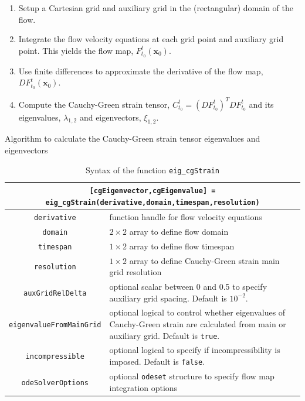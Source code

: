 \documentclass{article}
\begin{document}
\begin{table}
\begin{enumerate}
\item Setup a Cartesian grid and auxiliary grid in the (rectangular) domain of the flow.
\item Integrate the flow velocity equations at each grid point and auxiliary grid point. This yields the flow map, $F_{t_0}^t(\boldsymbol x_0)$.
\item Use finite differences to approximate the derivative of the flow map, $D F_{t_0}^t(\boldsymbol x_0)$.
\item Compute the Cauchy-Green strain tensor, $C_{t_0}^t = \left(D F_{t_0}^t\right)^T D F_{t_0}^t$ and its eigenvalues, $\lambda_{1,2}$ and eigenvectors, $\xi_{1,2}$.
\end{enumerate}
\caption{Algorithm to calculate the Cauchy-Green strain tensor eigenvalues and eigenvectors}
\label{t:Cauchy-Green algorithm}
\end{table}

\begin{table}
\begin{center}
\begin{tabular}{|c|p{}|}
\hline \hline
\multicolumn{2}{|p{\textwidth}|}{\lstinline![cgEigenvector,cgEigenvalue] = eig_cgStrain(derivative,domain,timespan,resolution)!}\\
\hline
\lstinline!derivative! & function handle for flow velocity equations\\
\hline
\lstinline!domain! & $2 \times 2$ array to define flow domain\\
\hline
\lstinline!timespan! & $1 \times 2$ array to define flow timespan\\
\hline
\lstinline!resolution! & $1 \times 2$ array to define Cauchy-Green strain main grid resolution\\
\hline
\lstinline!auxGridRelDelta! & optional scalar between 0 and 0.5 to specify auxiliary grid spacing. Default is $10^{-2}$.\\
\hline
\lstinline!eigenvalueFromMainGrid! & optional logical to control whether eigenvalues of Cauchy-Green strain are calculated from main or auxiliary grid. Default is \lstinline!true!.\\
\hline
\lstinline!incompressible! & optional logical to specify if incompressibility is imposed. Default is  \lstinline!false!.\\
\hline
\lstinline!odeSolverOptions! & optional \lstinline!odeset! structure to specify flow map integration options\\
\hline \hline
\end{tabular}
\caption{Syntax of the function \lstinline!eig_cgStrain!}
\label{t:eig_cgStrain syntax}
\end{center}
\end{table}
\end{document}
